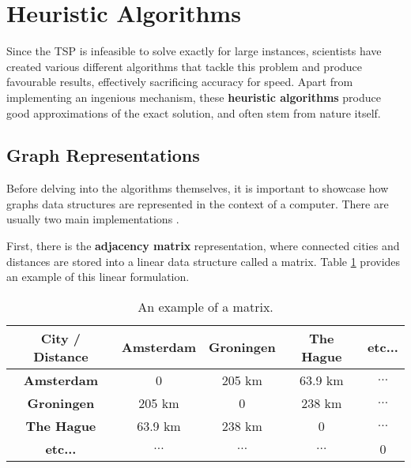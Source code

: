 
\section{Heuristic Algorithms}
\label{sec: heuristics}

Since the TSP is infeasible to solve exactly for large instances, scientists have created various different algorithms that tackle this problem and produce favourable results, effectively sacrificing accuracy for speed. Apart from implementing an ingenious mechanism, these \textbf{heuristic algorithms} produce good approximations of the exact solution, and often stem from nature itself.

\subsection{Graph Representations}
Before delving into the algorithms themselves, it is important to showcase how graphs data structures are represented in the context of a computer. There are usually two main implementations \cite{cormen2022introduction}.

First, there is the \textbf{adjacency matrix} representation, where connected cities and distances are stored into a linear data structure called a matrix. Table \ref{table: adjacency_matrix_example} provides an example of this linear formulation.

\begin{table}
	\centering
	\begin{tabular}{ |c|c|c|c|c| }
		\hline
		\textbf{City / Distance} & \textbf{Amsterdam} & \textbf{Groningen} & \textbf{The Hague} & \textbf{ etc...} \\
		\hline
		\textbf{Amsterdam} & 0 & 205 km & 63.9 km & \( \dots \) \\
		\textbf{Groningen} & 205 km & 0 & 238 km & \( \dots \) \\
		\textbf{The Hague} & 63.9 km & 238 km & 0 & \( \dots \) \\
		\textbf{etc...} & \( \dots \) & \( \dots \) & \( \dots \) & 0 \\
		\hline
	\end{tabular}
	\caption{An example of a matrix.}
	\label{table: adjacency_matrix_example}
\end{table}

